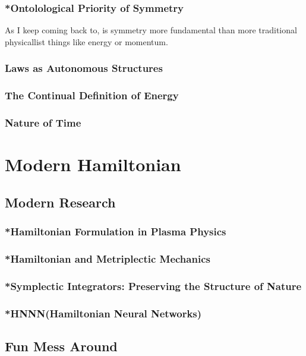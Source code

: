 \subsubsection{*Ontolological Priority of Symmetry}
As I keep coming back to, is symmetry more fundamental than more traditional physicallist things like energy or momentum.


\subsubsection{Laws as Autonomous Structures}

\subsubsection{The Continual Definition of Energy}

\subsubsection{Nature of Time}

\section{Modern Hamiltonian}
\subsection{Modern Research}
\subsubsection{*Hamiltonian Formulation in Plasma Physics}
\subsubsection{*Hamiltonian and Metriplectic Mechanics}
\subsubsection{*Symplectic Integrators: Preserving the Structure of Nature}
\subsubsection{*HNNN(Hamiltonian Neural Networks)}
\subsection{Fun Mess Around}
